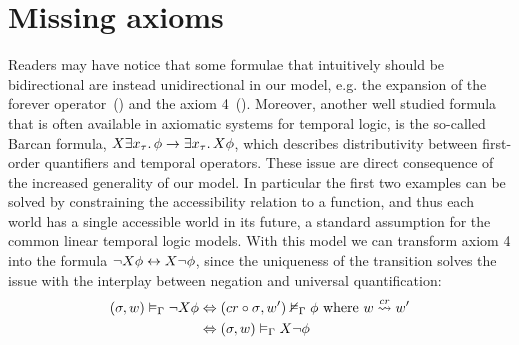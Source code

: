 \section{Missing axioms}
Readers may have notice that some formulae that intuitively should be bidirectional are instead unidirectional in our
model, e.g. the expansion of the forever operator~() and the axiom 4~(). Moreover,
another well studied formula that is often available in axiomatic systems for temporal logic, is the so-called Barcan
formula, $X{\exists {x_\tau} \ldotp {\phi}} \to \exists {x_\tau} \ldotp {X{\phi}}$, which describes distributivity between
first-order quantifiers and temporal operators.
These issue are direct consequence of the increased generality of our model. In particular the first two examples can be
solved by constraining the accessibility relation to a function, and thus each world has a single accessible world in
its future, a standard assumption for the common linear temporal logic models.
With this model we can transform axiom 4 into the formula $\neg X{\phi} \leftrightarrow X{\neg\phi}$, since
the uniqueness of the transition solves the issue with the interplay between negation and universal quantification:
\[
  \begin{split}
    ({\sigma}, {w}) \vDash_{\Gamma} {\neg X{\phi}}
      &\Leftrightarrow ({cr \circ \sigma}, {w'}) \nvDash_{\Gamma} {\phi} \text{ where } w \overset{cr}{\rightsquigarrow} w' \\
      &\Leftrightarrow ({\sigma}, {w}) \vDash_{\Gamma} {X{\neg\phi}}
  \end{split}
\]

